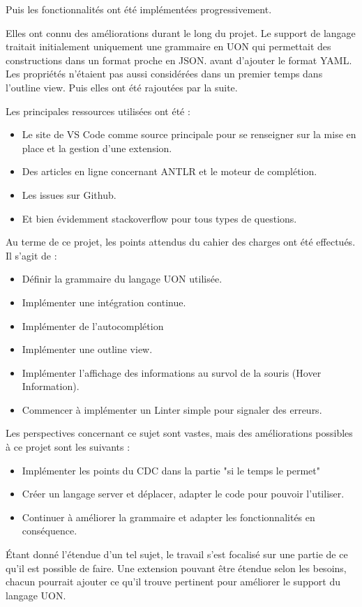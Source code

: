 Puis les fonctionnalités ont été implémentées progressivement.

Elles ont connu des améliorations durant le long du projet.
Le support de langage traitait initialement uniquement une grammaire en UON qui permettait des constructions dans un format proche en JSON.
avant d'ajouter le format YAML.
Les propriétés n'étaient pas aussi considérées dans un premier temps dans l'outline view. Puis elles ont été rajoutées par la suite.

Les principales ressources utilisées ont été :

\begin{itemize}
    \item Le site de VS Code comme source principale pour se renseigner sur la mise en place et la gestion d'une extension.
    \item Des articles en ligne concernant ANTLR et le moteur de complétion.
    \item Les issues sur Github.
    \item Et bien évidemment stackoverflow pour tous types de questions.
\end{itemize}


Au terme de ce projet, les points attendus du cahier des charges ont été effectués. Il s'agit de :
\begin{itemize}
    \item Définir la grammaire du langage UON utilisée.
    \item Implémenter une intégration continue.
    \item Implémenter de l'autocomplétion
    \item Implémenter une outline view.
    \item Implémenter l'affichage des informations au survol de la souris (Hover Information).
    \item Commencer à implémenter un Linter simple pour signaler des erreurs.
\end{itemize}

Les perspectives concernant ce sujet sont vastes, mais des améliorations possibles à ce projet sont les suivants :
\begin{itemize}
    \item Implémenter les points du CDC dans la partie "si le temps le permet"
    \item Créer un langage server et déplacer, adapter le code pour pouvoir l'utiliser.
    \item Continuer à améliorer la grammaire et adapter les fonctionnalités en conséquence.
\end{itemize}

Étant donné l'étendue d'un tel sujet, le travail s'est focalisé sur une partie de ce qu'il est possible de faire.
Une extension pouvant être étendue selon les besoins, chacun pourrait ajouter ce qu'il trouve pertinent pour améliorer le support du langage UON.

